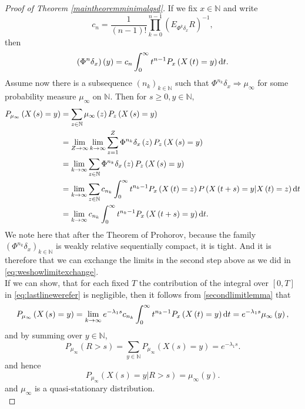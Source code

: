 \documentclass[12pt,a4paper]{scrartcl}
\numberwithin{equation}{section}
\newcommand{\N}{\mathbb{N}} %
\begin{document}
\begin{proof}[Proof of Theorem \ref{maintheoremminimalqsd}]
If we fix $x \in \N$ and write
$$c_n = \frac{1}{\left(n-1\right)!} \prod_{k=0}^{n-1} \left(E_{\Phi^k \delta_x} R\right)^{-1},$$
then
$$\left(\Phi^n\delta_x\right)\left(y\right) = c_n \int_0^{\infty} t^{n-1} P_x\left( X\left(t\right)=y \right) \textnormal{d}t. $$
Assume now there is a subsequence $\left(n_k\right)_{k \in \N}$ such that $\Phi^{n_k}\delta_x \Rightarrow \mu_{\infty}$ for some probability measure $\mu_{\infty}$ on $\N.$ Then for $s \geq 0, y \in \N,$
\begin{align}
P_{\mu_{\infty}}\left(X\left(s\right) = y\right) &= \sum_{z \in \N} \mu_{\infty}\left(z\right) P_z\left(X\left(s\right) = y\right)  \nonumber \\
&=\lim_{Z \to \infty} \lim_{k \to \infty} \sum_{z=1}^Z \Phi^{n_k}\delta_x\left(z\right) P_z\left(X\left(s\right) = y\right) \nonumber \\ 
&=\lim_{k \to \infty} \sum_{z \in \N} \Phi^{n_k}\delta_x\left(z\right) P_z\left(X\left(s\right) = y\right) \nonumber\\ 
&=\lim_{k \to \infty} \sum_{z \in \N} c_{n_k} \int_0^{\infty} t^{n_k-1} P_x\left(X\left(t\right) = z\right) P\left(X\left(t+s\right)=y | X\left(t\right) = z\right) \textnormal{d} t \nonumber \\ 
&=\lim_{k \to \infty} c_{n_k} \int_0^{\infty} t^{n_k-1} P_x\left(X\left(t+s\right) = y\right) \textnormal{d}t. \label{eq:lastlinewerefer}
\end{align}
We note here that after the Theorem of Prohorov, because the family $\left(\Phi^{n_k}\delta_x \right)_{k \in \N}$ is weakly relative sequentially compact, it is tight. And it is therefore that we can exchange the limits in the second step above as we did in \eqref{eq:weshowlimitexchange}.\\[1em]

If we can show, that for each fixed $T$ the contribution of the integral over $\left[0,T\right]$ in \eqref{eq:lastlinewerefer} is negligible, then it follows from \eqref{secondlimitlemma} that 
$$P_{\mu_{\infty}}\left(X\left(s\right) = y \right) = \lim_{k \to \infty} e^{-\lambda_1 s} c_{n_k} \int_0^{\infty} t^{n_k-1} P_x\left(X\left(t\right) = y\right) \textnormal{d}t = e^{-\lambda_1 s} \mu_{\infty}\left(y\right),$$
and by summing over $y \in \N$,
\begin{equation} \label{eq:fromhereitismqsd}
P_{\mu_{\infty}}\left(R > s \right) = \sum_{y \in \N} P_{\mu_{\infty}}\left(X\left(s\right) = y \right) = e^{-\lambda_1 s}.
\end{equation}
and hence
$$P_{\mu_{\infty}}\left(X\left(s\right) = y | R > s \right) = \mu_{\infty}\left(y\right).$$
and $\mu_{\infty}$ is a quasi-stationary distribution.\\[2ex]


\end{proof}
\end{document}
